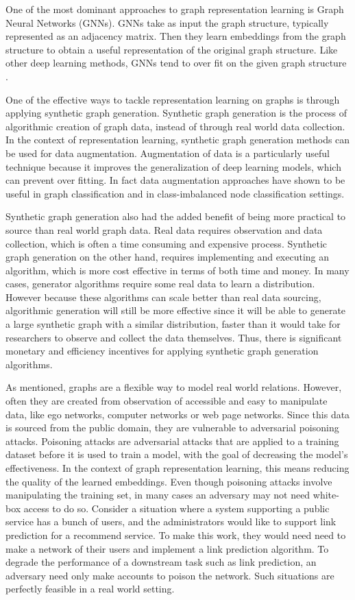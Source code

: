 \documentclass{article}
\begin{document}
One of the most dominant approaches to graph representation learning is Graph Neural Networks (GNNs). GNNs take as input the graph structure, typically represented as an adjacency matrix. Then they learn embeddings from the graph structure to obtain a useful representation of the original graph structure. Like other deep learning methods, GNNs tend to over fit on the given graph structure \cite{bechlerspeicher2024graph}.

One of the effective ways to tackle representation learning on graphs is through applying synthetic graph generation. Synthetic graph generation is the process of algorithmic creation of graph data, instead of through real world data collection. In the context of representation learning, synthetic graph generation methods can be used for data augmentation. Augmentation of data is a particularly useful technique because it improves the generalization of deep learning models, which can prevent over fitting. In fact data augmentation approaches have shown to be useful in graph classification \cite{gmixup} and in class-imbalanced node classification \cite{graphmixup} settings.  

Synthetic graph generation also had the added benefit of being more practical to source than real world graph data. Real data requires observation and data collection, which is often a time consuming and expensive process. Synthetic graph generation on the other hand, requires implementing and executing an algorithm, which is more cost effective in terms of both time and money. In many cases, generator algorithms require some real data to learn a distribution. However because these algorithms can scale better than real data sourcing, algorithmic generation will still be more effective since it will be able to generate a large synthetic graph with a similar distribution, faster than it would take for researchers to observe and collect the data themselves. Thus, there is significant monetary and efficiency incentives for applying synthetic graph generation algorithms. 

As mentioned, graphs are a flexible way to model real world relations. However, often they are created from observation of accessible and easy to manipulate data, like ego networks, computer networks or web page networks. Since this data is sourced from the public domain, they are vulnerable to adversarial poisoning attacks. Poisoning attacks are adversarial attacks that are applied to a training dataset before it is used to train a model, with the goal of decreasing the model's effectiveness. In the context of graph representation learning, this means reducing the quality of the learned embeddings. Even though poisoning attacks involve manipulating the training set, in many cases an adversary may not need white-box access to do so. Consider a situation where a system supporting a public service has a bunch of users, and the administrators would like to support link prediction for a recommend service. To make this work, they would need need to make a network of their users and implement a link prediction algorithm. To degrade the performance of a downstream task such as link prediction, an adversary need only make accounts to poison the network. Such situations are perfectly feasible in a real world setting. 
\end{document}

